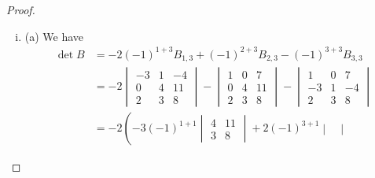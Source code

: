 \begin{proof}
\begin{enumerate}[(i)]
\begin{alignat*}{2}
\begin{aligned}
                &\ro{-R_2}\\
                &\ro{R_3/2}\\
                &\ro{R_4-2R_1}
            \end{aligned}
            \begin{sysmatrix}{cccc}
                1 & 2 & 3 & 2\\
                0 & 1 & -7 & 2\\
                0 & 0 & 1 & 0.5\\
                0 & -4 & -3 & -3
            \end{sysmatrix}
            \begin{aligned}
                &\ro{R_1-2R_2}\\
                &\ro{R_2+7R_3}\\
                &\ro{R_4+4R_2}
            \end{aligned}
        \end{alignat*}
        \item (a) We have 
        \[
            \begin{aligned}
                \det B
                &=-2(-1)^{1+3}B_{1,3}+(-1)^{2+3}B_{2,3}-(-1)^{3+3}B_{3,3}\\
                &=-2\begin{vmatrix}
                    -3 & 1 & -4\\
                    0 & 4 & 11\\
                    2 & 3 & 8
                \end{vmatrix}
                -\begin{vmatrix}
                    1 & 0 & 7\\
                    0 & 4 & 11\\
                    2 & 3 & 8
                \end{vmatrix}
                -\begin{vmatrix}
                    1 & 0 & 7\\
                    -3 & 1 & -4\\
                    2 & 3 & 8
                \end{vmatrix}\\
                &=-2\left(-3(-1)^{1+1}\begin{vmatrix}
                    4 & 11\\
                    3 & 8
                \end{vmatrix}+2(-1)^{3+1}\begin{vmatrix}

\end{vmatrix}
\end{aligned}\]
\end{enumerate}
\end{proof}
